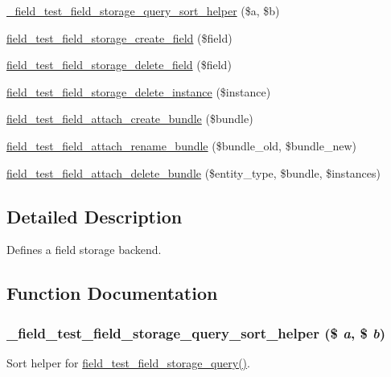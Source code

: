 \begin{DoxyCompactItemize}
\item 
\hyperlink{field__test_8storage_8inc_aab2952ce75621878ed21f4ebbb8eeb55}{\_\-field\_\-test\_\-field\_\-storage\_\-query\_\-sort\_\-helper} (\$a, \$b)
\item 
\hyperlink{field__test_8storage_8inc_a40793876a6a577af289bfcc98d4d3b17}{field\_\-test\_\-field\_\-storage\_\-create\_\-field} (\$field)
\item 
\hyperlink{field__test_8storage_8inc_a3f9bebc0bc8a81e2a751383cc7d40e32}{field\_\-test\_\-field\_\-storage\_\-delete\_\-field} (\$field)
\item 
\hyperlink{field__test_8storage_8inc_a27f07a8c8348e9818bb59b29f1c3f6a0}{field\_\-test\_\-field\_\-storage\_\-delete\_\-instance} (\$instance)
\item 
\hyperlink{field__test_8storage_8inc_a3581120282b508adec7dddc2f0fabf86}{field\_\-test\_\-field\_\-attach\_\-create\_\-bundle} (\$bundle)
\item 
\hyperlink{field__test_8storage_8inc_a77f0715aaf93ca0aa9bc787d4ebafa06}{field\_\-test\_\-field\_\-attach\_\-rename\_\-bundle} (\$bundle\_\-old, \$bundle\_\-new)
\item 
\hyperlink{field__test_8storage_8inc_aa5c9edad9e400853b20018ed13eca602}{field\_\-test\_\-field\_\-attach\_\-delete\_\-bundle} (\$entity\_\-type, \$bundle, \$instances)
\end{DoxyCompactItemize}


\subsection{Detailed Description}
Defines a field storage backend. 

\subsection{Function Documentation}
\hypertarget{field__test_8storage_8inc_aab2952ce75621878ed21f4ebbb8eeb55}{
\subsubsection[{\_\-field\_\-test\_\-field\_\-storage\_\-query\_\-sort\_\-helper}]{\setlength{\rightskip}{0pt plus 5cm}\_\-field\_\-test\_\-field\_\-storage\_\-query\_\-sort\_\-helper (\$ {\em a}, \/  \$ {\em b})}}
\label{field__test_8storage_8inc_aab2952ce75621878ed21f4ebbb8eeb55}
Sort helper for \hyperlink{field__test_8storage_8inc_af02cd305f81f7d4059a81aab41d13b4c}{field\_\-test\_\-field\_\-storage\_\-query()}.

